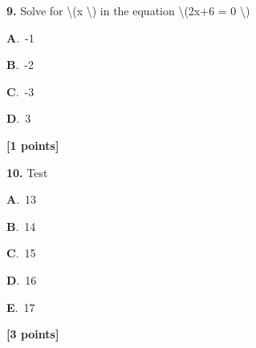 \documentclass[12pt]{article}
\newcommand{\choice}[3]{%
  \noindent\textbf{#1}.~#2\hfill#3\par\vspace{0.25em}
}
\begin{document}
\noindent \textbf{\textenglish{9.}} {\textenglish{Solve for \textbackslash{}(x \textbackslash{}) in the equation \textbackslash{}(2x+6 = 0 \textbackslash{})}}

\noindent\choice{A}{{\textenglish{-1}}}{}
\noindent\choice{B}{{\textenglish{-2}}}{}
\noindent\choice{C}{{\textenglish{-3}}}{}
\noindent\choice{D}{{\textenglish{3}}}{}
\hfill \textbf{[1 points]}\vspace{0.5em}

\noindent \textbf{\textenglish{10.}} {\textenglish{Test}}

\noindent\choice{A}{{\textenglish{13}}}{}
\noindent\choice{B}{{\textenglish{14}}}{}
\noindent\choice{C}{{\textenglish{15}}}{}
\noindent\choice{D}{{\textenglish{16}}}{}
\noindent\choice{E}{{\textenglish{17}}}{}
\hfill \textbf{[3 points]}\vspace{0.5em}
\end{document}
